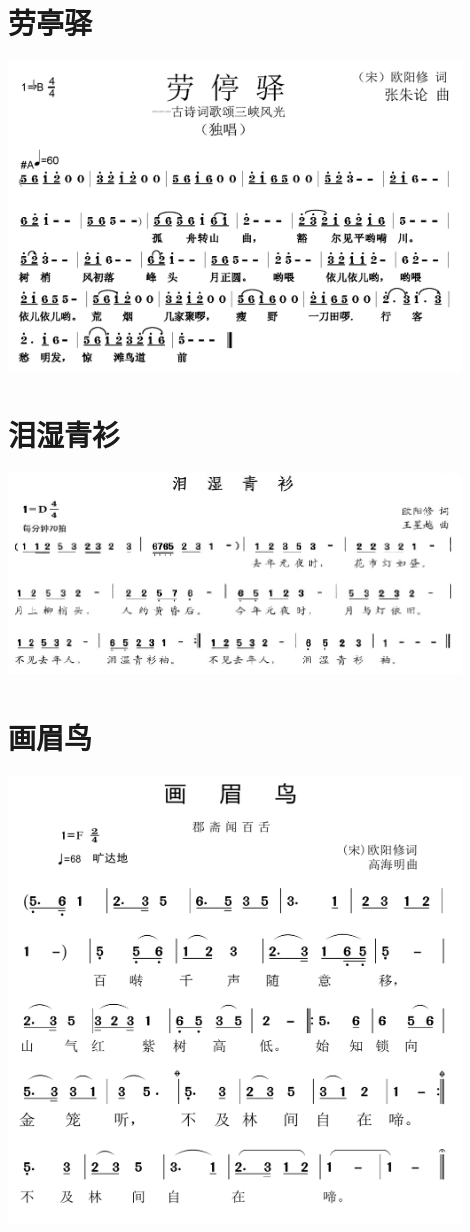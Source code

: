 \documentclass[cn,pad,twocol]{elegantbook}
\begin{document}
\section{劳亭驿} \includegraphics[width=0.9\textwidth]{rpi400/20210212欧阳修-劳亭驿.png}
\section{泪湿青衫} \includegraphics[width=0.9\textwidth]{rpi400/20210212欧阳修-泪湿青衫.png}
\section{画眉鸟} \includegraphics[width=0.9\textwidth]{rpi400/20210212欧阳修-画眉鸟.png}
\end{document}
